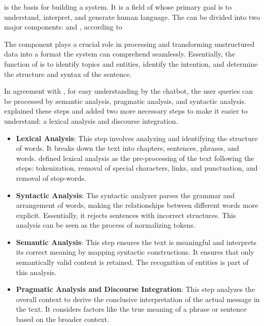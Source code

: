 {\nlp} is the basis for building a {\qa} system. It is a field of {\ai} whose primary goal is to understand, interpret, and generate human language. The {\nlp} can be divided into two major components: {\nlu} and {\nlg}, according to \citet{ayanouz_smart_2020}

The \textbf{ {\nlu} } component plays a crucial role in processing and transforming unstructured data into a format the system can comprehend seamlessly. Essentially, the function of {\nlu} is to identify topics and entities, identify the intention, and determine the structure and syntax of the sentence.

In agreement with \citet{ngai_intelligent_2021}, for easy understanding by the chatbot, the user queries can be processed by semantic analysis, pragmatic analysis, and syntactic analysis. \citet{ayanouz_smart_2020} explained these steps and added two more necessary steps to make it easier to understand: a lexical analysis and discourse integration.

\begin{itemize}
    \item \textbf{Lexical Analysis}: This step involves analyzing and identifying the structure of words. It breaks down the text into chapters, sentences, phrases, and words. \citet{chizhik_challenges_2020} defined lexical analysis as the pre-processing of the text following the steps: tokenization, removal of special characters, links, and punctuation, and removal of stop-words.

    \item \textbf{Syntactic Analysis}: The syntactic analyzer parses the grammar and arrangement of words, making the relationships between different words more explicit. Essentially, it rejects sentences with incorrect structures. This analysis can be seen as the process of normalizing tokens.

    \item \textbf{Semantic Analysis}: This step ensures the text is meaningful and interprets its correct meaning by mapping syntactic constructions. It ensures that only semantically valid content is retained. The recognition of entities is part of this analysis.

    \item \textbf{Pragmatic Analysis and Discourse Integration}: This step analyzes the overall context to derive the conclusive interpretation of the actual message in the text. It considers factors like the true meaning of a phrase or sentence based on the broader context.
\end{itemize}

